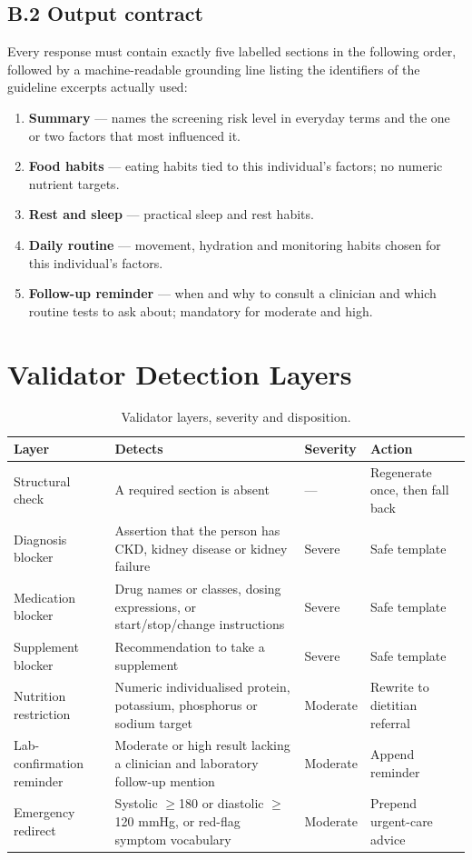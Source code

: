 \section*{B.2 Output contract}

Every response must contain exactly five labelled sections in the following
order, followed by a machine-readable grounding line listing the identifiers of
the guideline excerpts actually used:

\begin{enumerate}
  \item \textbf{Summary} --- names the screening risk level in everyday terms
        and the one or two factors that most influenced it.
  \item \textbf{Food habits} --- eating habits tied to this individual's
        factors; no numeric nutrient targets.
  \item \textbf{Rest and sleep} --- practical sleep and rest habits.
  \item \textbf{Daily routine} --- movement, hydration and monitoring habits
        chosen for this individual's factors.
  \item \textbf{Follow-up reminder} --- when and why to consult a clinician and
        which routine tests to ask about; mandatory for moderate and high.
\end{enumerate}

\chapter{Validator Detection Layers}
\label{app:validator}

\begin{table}[H]
\centering
\caption{Validator layers, severity and disposition.}
\label{tab:app_validator}
\small
\begin{tabularx}{\textwidth}{@{}L{1.35in} X l L{1.05in}@{}}
\toprule
\textbf{Layer} & \textbf{Detects} & \textbf{Severity} & \textbf{Action} \\
\midrule
Structural check & A required section is absent &
--- & Regenerate once, then fall back \\
Diagnosis blocker & Assertion that the person has CKD, kidney disease or kidney
failure & Severe & Safe template \\
Medication blocker & Drug names or classes, dosing expressions, or
start/stop/change instructions & Severe & Safe template \\
Supplement blocker & Recommendation to take a supplement & Severe &
Safe template \\
Nutrition restriction & Numeric individualised protein, potassium, phosphorus or
sodium target & Moderate & Rewrite to dietitian referral \\
Lab-confirmation reminder & Moderate or high result lacking a clinician and
laboratory follow-up mention & Moderate & Append reminder \\
Emergency redirect & Systolic $\geq$180 or diastolic $\geq$120 mmHg, or red-flag
symptom vocabulary & Moderate & Prepend urgent-care advice \\
\bottomrule
\end{tabularx}
\end{table}

